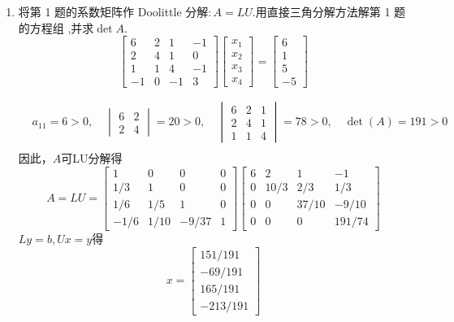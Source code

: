\documentclass[a4paper]{article}
\begin{document}
\courseheader
{}

\begin{enumerate}
  \setlength{\itemsep}{3\parskip}

  \item 将第 1 题的系数矩阵作 Doolittle 分解$:A=LU.$用直接三角分解方法解第 1 题的方程组 ,并求$\det A.$
  $$\left[\begin{array}{cccc} 6 & 2 & 1 & -1 \\ 2 & 4 & 1 & 0 \\ 1 & 1 & 4 & -1 \\ -1 & 0 & -1 & 3 \end{array}\right]\left[\begin{array}{c} x_{1} \\ x_{2} \\ x_{3} \\ x_{4} \end{array}\right]=\left[\begin{array}{c} 6 \\ 1 \\ 5 \\ -5 \end{array}\right]$$
  \begin{solution}
    \begin{align*}
      &a_{11}=6>0,\quad
      \begin{vmatrix}
        6 & 2 \\ 
        2 & 4
      \end{vmatrix}=20>0,\quad
      \begin{vmatrix}
        6 & 2 & 1 \\ 
        2 & 4 & 1 \\ 
        1 & 1 & 4
      \end{vmatrix}=78>0,\quad
      \det(A)=191>0\\
    \end{align*}
    因此，$A$可LU分解得
    $$A=LU=\begin{bmatrix} 1 & 0 & 0 & 0 \\ 1/3 & 1 & 0 & 0 \\ 1/6 & 1/5 & 1 & 0 \\ -1/6 & 1/10 & -9/37 & 1 \end{bmatrix} \begin{bmatrix} 6 & 2 & 1 & -1 \\ 0 & 10/3 & 2/3 & 1/3 \\ 0 & 0 & 37/10 & -9/10 \\ 0 & 0 & 0 & 191/74 \end{bmatrix}$$
    $Ly=b,Ux=y$得
    $$x=\begin{bmatrix} 151/191 \\ -69/191 \\165/191 \\ -213/191 \end{bmatrix}$$
  \end{solution}


\end{enumerate}
\end{document}

